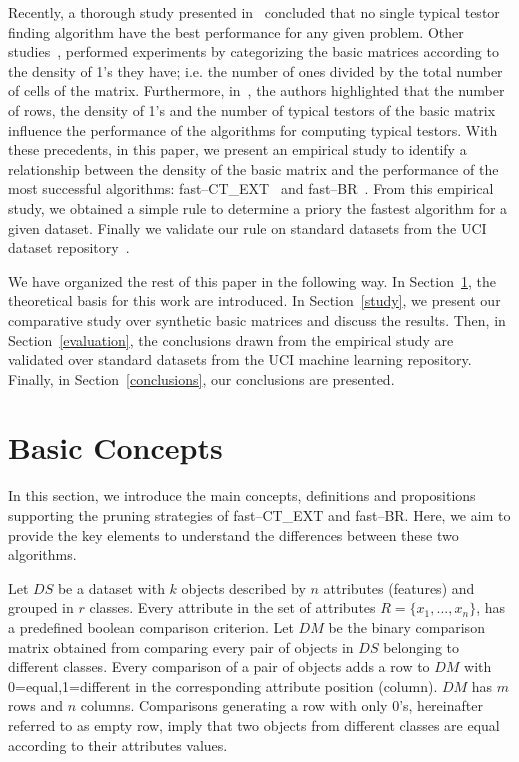 \documentclass[citenumber]{llncs}
\begin{document}
	Recently, a thorough study presented in~\cite{Alba13} concluded that no single typical testor finding algorithm have the best performance for any given problem. Other studies~\cite{Lias2013,Rodriguez15}, performed experiments by categorizing the  basic matrices according to the density of 1's they have; i.e. the number of ones divided by the total number of cells of the matrix. Furthermore, in~\cite{Gonzalez15}, the authors highlighted that the number of rows, the density of 1's and the number of typical testors of the basic matrix influence the performance of the algorithms for computing typical testors. With these precedents, in this paper, we present an empirical study to identify a relationship between the density of the basic matrix and the performance of the most successful algorithms: fast--CT\_EXT~\cite{Sanchez2010} and fast--BR~\cite{Lias2013}. From this empirical study, we obtained a simple rule to determine a priory the fastest algorithm for a given dataset. Finally we validate our rule on standard datasets from the UCI dataset repository~\cite{Bache13}. 
	
	We have organized the rest of this paper in the following way. In Section~\ref{basic_conctps}, the theoretical basis for this work are introduced. In Section~\ref{study}, we present our comparative study over synthetic basic matrices and discuss the results. Then, in Section~\ref{evaluation}, the conclusions drawn from the empirical study are validated over standard datasets from the UCI machine learning repository. Finally, in Section~\ref{conclusions}, our conclusions are presented.
%
\section{Basic Concepts} \label{basic_conctps}
%
	In this section, we introduce the main concepts, definitions and propositions supporting the pruning strategies of fast--CT\_EXT and fast--BR. Here, we aim to provide the key elements to understand the differences between these two algorithms. 
	
	Let $DS$ be a dataset with $k$ objects described by $n$ attributes (features) and grouped in $r$ classes. Every attribute in the set of attributes $R=\lbrace x_1,...,x_n \rbrace$, has a predefined boolean comparison criterion. Let $DM$ be the binary comparison matrix obtained from comparing every pair of objects in $DS$ belonging to different classes. Every comparison of a pair of objects adds a row to $DM$ with 0=equal,1=different in the corresponding attribute position (column). $DM$ has $m$ rows and $n$ columns. Comparisons generating a row with only 0's, hereinafter referred to as empty row, imply that two objects from different classes are equal according to their attributes values. 
	
\end{document}
